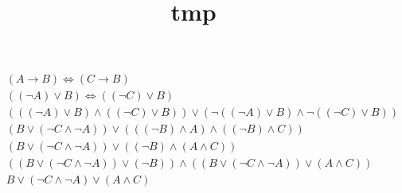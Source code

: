 
\title{tmp}
\usepackage{cancel}



\begin{align*}
	& (A \to B) \iff (C \to B) \\
	& ((\lnot A) \lor B) \iff ((\lnot C) \lor B) \\
	& (((\lnot A) \lor B) \land ((\lnot C) \lor B)) \lor (\lnot ((\lnot A) \lor B) \land \lnot((\lnot C) \lor B)) \\
	& (B \lor (\lnot C \land \lnot A)) \lor (((\lnot B) \land A) \land ((\lnot B) \land C)) \\
	& (B \lor (\lnot C \land \lnot A)) \lor ((\lnot B) \land (A \land C)) \\
	& ((B \lor (\lnot C \land \lnot A)) \lor (\lnot B)) \land ((B \lor (\lnot C \land \lnot A)) \lor (A \land C)) \\
	& B \lor (\lnot C \land \lnot A) \lor (A \land C) \\
\end{align*}



